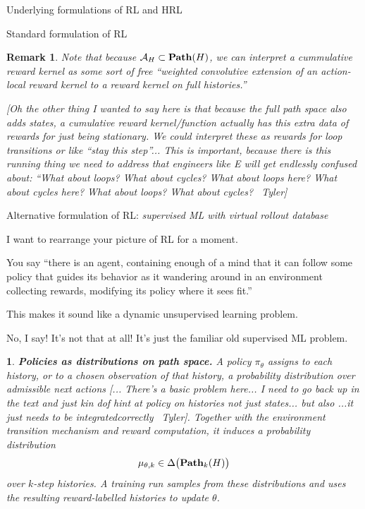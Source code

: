 \documentclass[11pt]{article}
\newtheorem{remark}[subsubsection]{Remark}
\newtheorem{ermark}[subsubsection]{}
\begin{document}
\begin{section}{Underlying formulations of RL and HRL}
\begin{subsection}{Standard formulation of RL}
\begin{remark}
\normalfont
Note that because $\mathcal{A}_{H}\subset\bold{Path}(H)$, we can interpret a cummulative reward kernel as some sort of free ``weighted convolutive extension of an action-local reward kernel to a reward kernel on full histories.''

{\color{blue} [Oh the other thing I wanted to say here is that because the full path space also adds states, a cumulative reward kernel/function actually has this extra data of rewards for just being stationary. We could interpret these as rewards for loop transitions or like ``stay this step''... This is important, because there is this running thing we need to address that engineers like E will get endlessly confused about: ``What about loops? What about cycles? What about loops here? What about cycles here? What about loops? What about cycles? \textemdash\ Tyler]}
\end{remark}
 
\end{subsection}

\begin{subsection}{Alternative formulation of RL: {\em supervised ML with virtual rollout database}}

I want to rearrange your picture of RL for a moment.

You say ``there is an agent, containing enough of a mind that it can follow some policy that guides its behavior as it wandering around in an environment collecting rewards, modifying its policy where it sees fit.'' 

This makes it sound like a dynamic unsupervised learning problem. 

No, I say! It's not that at all! It's just the familiar old supervised ML problem.

\begin{ermark}
{\bf Policies as distributions on path space.}
\normalfont
A policy \(\pi_\theta\) assigns to each history, or to a chosen observation of that history, a probability distribution over admissible next actions {\color{blue} [... There's a basic problem here... I need to go back up in the text and just kin dof hint at policy on histories not just states... but also ...it just needs to be integratedcorrectly \textemdash\ Tyler]}.  Together with the environment transition mechanism and reward computation, it induces a probability distribution
\[
    \mu_{\theta,k}\in \Delta\big(\bold{Path}_k(H)\big)
\]
over \(k\)-step histories.  A training run samples from these distributions and uses the resulting reward-labelled histories to update \(\theta\).
\end{ermark}


\end{subsection}
\end{section}
\end{document}
